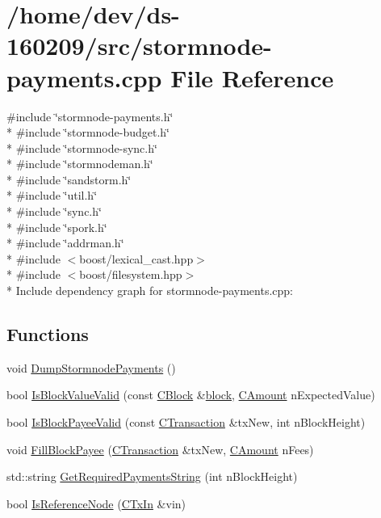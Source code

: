 \hypertarget{stormnode-payments_8cpp}{}\section{/home/dev/ds-\/160209/src/stormnode-\/payments.cpp File Reference}
\label{stormnode-payments_8cpp}
{\ttfamily \#include \char`\"{}stormnode-\/payments.\+h\char`\"{}}\\*
{\ttfamily \#include \char`\"{}stormnode-\/budget.\+h\char`\"{}}\\*
{\ttfamily \#include \char`\"{}stormnode-\/sync.\+h\char`\"{}}\\*
{\ttfamily \#include \char`\"{}stormnodeman.\+h\char`\"{}}\\*
{\ttfamily \#include \char`\"{}sandstorm.\+h\char`\"{}}\\*
{\ttfamily \#include \char`\"{}util.\+h\char`\"{}}\\*
{\ttfamily \#include \char`\"{}sync.\+h\char`\"{}}\\*
{\ttfamily \#include \char`\"{}spork.\+h\char`\"{}}\\*
{\ttfamily \#include \char`\"{}addrman.\+h\char`\"{}}\\*
{\ttfamily \#include $<$boost/lexical\+\_\+cast.\+hpp$>$}\\*
{\ttfamily \#include $<$boost/filesystem.\+hpp$>$}\\*
Include dependency graph for stormnode-\/payments.cpp\+:
\subsection*{Functions}
\begin{DoxyCompactItemize}
\item 
void \hyperlink{stormnode-payments_8cpp_ae992438141f991b3ca132d11da230d1a}{Dump\+Stormnode\+Payments} ()
\item 
bool \hyperlink{stormnode-payments_8cpp_a775fd7f6eef6c395268172c278b9100b}{Is\+Block\+Value\+Valid} (const \hyperlink{class_c_block}{C\+Block} \&\hyperlink{core_8h_ace80c27428e237fe24f54ae915a36133}{block}, \hyperlink{amount_8h_a4eaf3a5239714d8c45b851527f7cb564}{C\+Amount} n\+Expected\+Value)
\item 
bool \hyperlink{stormnode-payments_8cpp_af9e474d79a12729ed3e96b0d1c0351b4}{Is\+Block\+Payee\+Valid} (const \hyperlink{class_c_transaction}{C\+Transaction} \&tx\+New, int n\+Block\+Height)
\item 
void \hyperlink{stormnode-payments_8cpp_a1c78c12ef9ef9becb2701ac56c3996ec}{Fill\+Block\+Payee} (\hyperlink{class_c_transaction}{C\+Transaction} \&tx\+New, \hyperlink{amount_8h_a4eaf3a5239714d8c45b851527f7cb564}{C\+Amount} n\+Fees)
\item 
std\+::string \hyperlink{stormnode-payments_8cpp_a7828ab0b9a1302db35b658f727b260e1}{Get\+Required\+Payments\+String} (int n\+Block\+Height)
\item 
bool \hyperlink{stormnode-payments_8cpp_a0bca99aa555725c39171cc06fb3e94de}{Is\+Reference\+Node} (\hyperlink{class_c_tx_in}{C\+Tx\+In} \&vin)
\end{DoxyCompactItemize}
